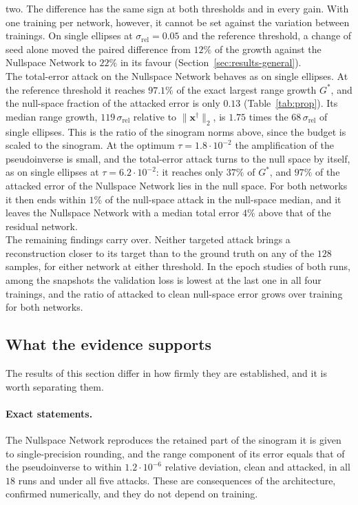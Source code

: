 \documentclass{article}
\numberwithin{equation}{section}
\begin{document}
two. The difference has the same sign at both thresholds and in every gain. With one training per
network, however, it cannot be set against the variation between trainings. On single ellipses at
$\sigma_\text{rel}=0.05$ and the reference threshold, a change of seed alone moved the paired difference
from $12\%$ of the growth against the Nullspace Network to $22\%$ in its favour
(Section~\ref{sec:results-general}).\\
The total-error attack on the Nullspace Network behaves as on single ellipses. At the reference threshold
it reaches $97.1\%$ of the exact largest range growth $G^*$, and the null-space fraction of the attacked
error is only $0.13$ (Table~\ref{tab:prop}). Its median range growth, $119\,\sigma_\text{rel}$ relative to
$\lVert\mathbf{x}^\dagger\rVert_2$, is $1.75$ times the $68\,\sigma_\text{rel}$ of single ellipses. This is
the ratio of the sinogram norms above, since the budget is scaled to the sinogram. At the optimum
$\tau=1.8\cdot10^{-2}$ the amplification of the pseudoinverse is small, and the total-error attack turns
to the null space by itself, as on single ellipses at $\tau=6.2\cdot10^{-2}$: it reaches only $37\%$ of
$G^*$, and $97\%$ of the attacked error of the Nullspace Network lies in the null space. For both networks
it then ends within $1\%$ of the null-space attack in the null-space median, and it leaves the Nullspace
Network with a median total error $4\%$ above that of the residual network.\\
The remaining findings carry over. Neither targeted attack brings a reconstruction closer to its target
than to the ground truth on any of the $128$ samples, for either network at either threshold. In the
epoch studies of both runs, among the snapshots the validation loss is lowest at the last one in all four
trainings, and the ratio of attacked to clean null-space error grows over training for both networks.

\subsection{What the evidence supports}\label{sec:results-claim}
The results of this section differ in how firmly they are established, and it is worth separating them.
\paragraph{Exact statements.} The Nullspace Network reproduces the retained part of the sinogram it is
given to single-precision rounding, and the range component of its error equals that of the pseudoinverse to within
$1.2\cdot10^{-6}$ relative deviation, clean and attacked, in all $18$ runs and under all five attacks. These are
consequences of the architecture, confirmed numerically, and they do not depend on training.
\end{document}
